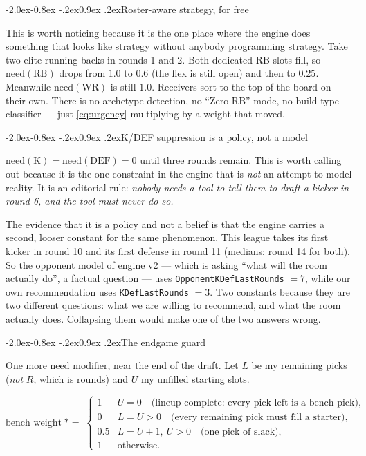 \documentclass[10pt,a4paper]{article}
\makeatletter
\theoremstyle{plain}
\theoremstyle{definition}
\theoremstyle{remark}
\newcommand{\code}[1]{\texttt{\small #1}}
\renewcommand\subsection{\@startsection{subsection}{2}{\z@}%
  {-2.0ex\@plus -0.8ex \@minus -.2ex}{0.9ex \@plus .2ex}{\normalfont\large\bfseries}}
\makeatother
\begin{document}
\subsection{Roster-aware strategy, for free}

This is worth noticing because it is the one place where the engine does something that
looks like strategy without anybody programming strategy. Take two elite running backs
in rounds 1 and 2. Both dedicated RB slots fill, so $\mathrm{need}(\text{RB})$ drops from
$1.0$ to $0.6$ (the flex is still open) and then to $0.25$. Meanwhile
$\mathrm{need}(\text{WR})$ is still $1.0$. Receivers sort to the top of the board on
their own. There is no archetype detection, no ``Zero RB'' mode, no build-type
classifier --- just \eqref{eq:urgency} multiplying by a weight that moved.

\subsection{K/DEF suppression is a policy, not a model}

$\mathrm{need}(\text{K}) = \mathrm{need}(\text{DEF}) = 0$ until three rounds remain.
This is worth calling out because it is the one constraint in the engine that is
\emph{not} an attempt to model reality. It is an editorial rule: \emph{nobody needs a
tool to tell them to draft a kicker in round 6, and the tool must never do so.}

The evidence that it is a policy and not a belief is that the engine carries a second,
looser constant for the same phenomenon. This league takes its first kicker in round 10
and its first defense in round 11 (medians: round 14 for both). So the opponent model of
engine v2 --- which is asking ``what will the room actually do'', a factual question ---
uses \code{OpponentKDefLastRounds} $= 7$, while our own recommendation uses
\code{KDefLastRounds} $= 3$. Two constants because they are two different questions:
what we are willing to recommend, and what the room actually does. Collapsing them would
make one of the two answers wrong.

\subsection{The endgame guard}

One more need modifier, near the end of the draft. Let $L$ be my remaining picks
(\emph{not} $R$, which is rounds) and $U$ my unfilled starting slots.

\begin{equation}
\text{bench weight} \;\mathrel{*{=}}\;
\begin{cases}
1    & U = 0 \quad \text{(lineup complete: every pick left is a bench pick)},\\
0    & L = U > 0 \quad \text{(every remaining pick must fill a starter)},\\
0.5  & L = U + 1,\ U > 0 \quad \text{(one pick of slack)},\\
1    & \text{otherwise}.
\end{cases}
\label{eq:endgame}
\end{equation}
\end{document}
